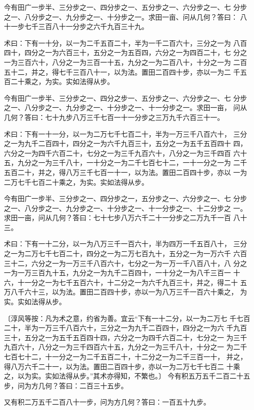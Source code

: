 \documentclass[a4paper,12pt,UTF8,twoside]{ctexbook}
\begin{document}
今有田广一步半、三分步之一、四分步之一、五分步之一、六分步之一、七 分步之一、八分步之一、九分步之一、十分步之一。求田一亩、问从几何？答曰： 八十一步七千三百八十一分步之六千九百三十九。

术曰：下有一十分，以一为二千五百二十，半为一千二百六十，三分之一为 八百四十，四分之一为六百三十，五分之一为五百四，六分之一为四百二十，七 分之一为三百六十，八分之一为三百一十五，九分之一为二百八十，十分之一为 二百五十二，并之，得七千三百八十一，以为法。置田二百四十步，亦以一为二 千五百二十乘之，为实。实如法得从步。

今有田广一步半、三分步之一、四分之步一、五分步之一、六分步之一、七 分步之一、八分步之一、九分步之一、十分步之一、十一分步之一。求田一亩， 问从几何？答曰：七十九步八万三千七百一十一分步之三万九千六百三十一。

术曰：下有一十一分，以一为二万七千七百二十，半为一万三千八百六十， 三分之一为九千二百四十，四分之一为六千九百三十，五分之一为五千五百四十 四，六分之一为四千六百二十，七分之一为三千九百六十，八分之一为三千四百 六十五，九分之一为三千八十，一十分之一为二千七百七十二，一十一分之一为 二千五百二十，并之，得八万三千七百一十一，以为法。置田二百四十步，亦以 一为二万七千七百二十乘之，为实。实如法得从步。

今有田广一步半、三分步之一、四分步之一，五分步之一、六分步之一、七 分步之一、八分步之一、九分步之一、十分步之一、十一分步之一、十二分步之 一。求田一亩，问从几何？答曰：七十七步八万六千二十一分步之二万九千一百 八十三。

术曰：下有一十二分，以一为八万三千一百六十，半为四万一千五百八十， 三分之一为二万七千七百二十，四分之一为二万七百九十，五分之一为一万六千 六百三十二，六分之一为一万三千八百六十，七分之一为一万一千八百八十，八 分之一为一万三百九十五，九分之一为九千二百四十，一十分之一为八千三百一 十六，十一分之一为七千五百六十，十二分之一为六千九百三十，并之，得二十 五万八千六十三，以为法。置田二百四十步，亦以一为八万三千一百六十乘之， 为实。实如法得从步。

〔淳风等按：凡为术之意，约省为善。宜云“下有一十二分，以一为二万七 千七百二十，半为一万三千八百六十，三分之一为九千二百四十，四分之一为六 千九百三十，五分之一为五千五百四十四，六分之一为四千六百二十，七分之一 为三千九百六十，八分之一为三千四百六十五，九分之一为三千八十，十分之一 为二千七百七十二，十一分之一为二千五百二十，十二分之一为二千三百一十， 并之，得八万六千二十一，以为法。置田二百四十步，亦以一为二万七千七百二 十乘之，以为实。实如法得从步。”其术亦得知，不繁也。〕 今有积五万五千二百二十五步，问为方几何？答曰：二百三十五步。

又有积二万五千二百八十一步，问为方几何？答曰：一百五十九步。
\end{document}
